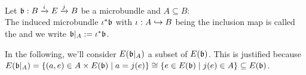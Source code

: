 \\ Let $\bb: \bundle{B}{E}{i}{j}$ be a microbundle and $A \subseteq B$:
\\ The induced microbundle $\iota^*\bb$ with $\iota: A \incl B$ being the inclusion map is called the  and we write $\bb \restrict{A} := \iota^*\bb$.

\begin{remark}
In the following, we'll consider $E(\bb\restrict{A})$ a subset of $E(\bb)$.
This is justified because
$E(\bb\restrict{A}) = \{ (a, e) \in A \times E(\bb) \mid a = j(e) \} \cong \{ e \in E(\bb) \mid j(e) \in A \} \subseteq E(\bb)$.
\end{remark}